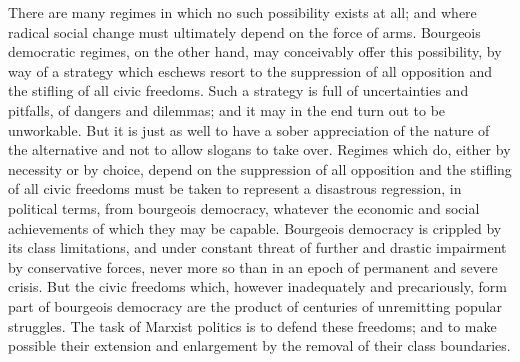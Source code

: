 There are many regimes in which no such possibility exists at all; and where radical social change must ultimately depend on the force of arms. Bourgeois democratic regimes, on the other hand, may conceivably offer this possibility, by way of a strategy which eschews resort to the suppression of all opposition and the stifling of all civic freedoms. Such a strategy is full of uncertainties and pitfalls, of dangers and dilemmas; and it may in the end turn out to be unworkable. But it is just as well to have a sober appreciation of the nature of the alternative and not to allow slogans to take over. Regimes which do, either by necessity or by choice, depend on the suppression of all opposition and the stifling of all civic freedoms must be taken to represent a disastrous regression, in political terms, from bourgeois democracy, whatever the economic and social achievements of which they may be capable. Bourgeois democracy is crippled by its class limitations, and under constant threat of further and drastic impairment by conservative forces, never more so than in an epoch of permanent and severe crisis. But the civic freedoms which, however inadequately and precariously, form part of bourgeois democracy are the product of centuries of unremitting popular struggles. The task of Marxist politics is to defend these freedoms; and to make possible their extension and enlargement by the removal of their class boundaries.

